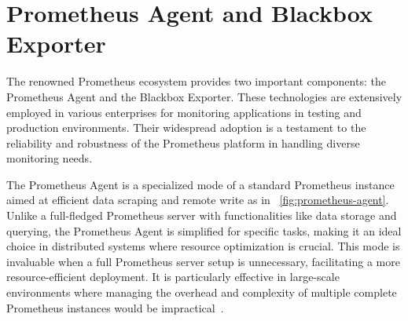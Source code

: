 \section{Prometheus Agent and Blackbox Exporter}

The renowned Prometheus ecosystem provides two important components: the Prometheus Agent and the Blackbox Exporter. These technologies are extensively employed in various enterprises for monitoring applications in testing and production environments. Their widespread adoption is a testament to the reliability and robustness of the Prometheus platform in handling diverse monitoring needs.

The Prometheus Agent is a specialized mode of a standard Prometheus instance aimed at efficient data scraping and remote write as in ~\autoref{fig:prometheus-agent}. Unlike a full-fledged Prometheus server with functionalities like data storage and querying, the Prometheus Agent is simplified for specific tasks, making it an ideal choice in distributed systems where resource optimization is crucial. This mode is invaluable when a full Prometheus server setup is unnecessary, facilitating a more resource-efficient deployment. It is particularly effective in large-scale environments where managing the overhead and complexity of multiple complete Prometheus instances would be impractical~\parencite{prometheusIntroducingPrometheusAgent}.

